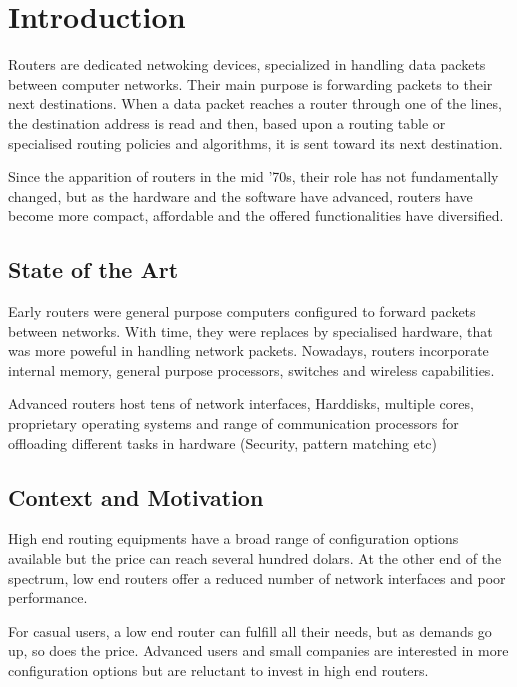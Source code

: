 \chapter{Introduction}
\label{chapter:intro}

Routers are dedicated netwoking devices, specialized in handling data
packets between computer networks. Their main purpose is forwarding packets to
their next destinations. When a data packet reaches a router through one of
the lines, the destination address is read and then, based upon a routing
table or specialised routing policies and algorithms, it is sent toward
its next destination.

Since the apparition of routers in the mid '70s, their role has not 
fundamentally changed, but as the hardware and the software have advanced, 
routers have become more compact, affordable and the offered functionalities
have diversified.


\section{State of the Art}
\label{sec:state-of-the-art}

Early routers were general purpose computers configured to forward packets
between networks. With time, they were replaces by specialised hardware,
that was more poweful in handling network packets.
Nowadays, routers incorporate internal memory, general purpose processors, 
switches and wireless capabilities.

Advanced routers host tens of network interfaces, Harddisks, multiple cores,
proprietary operating systems and range of communication processors
for offloading different tasks in hardware (Security, pattern matching etc)

\section{Context and Motivation}
\label{sec:context-and-motivation}

High end routing equipments have a broad range of configuration options
available but the price can reach several hundred dolars. At the other
end of the spectrum, low end routers offer a reduced number of network
interfaces and poor performance.

For casual users, a low end router can fulfill all their needs, but as
demands go up, so does the price. Advanced users and small companies
are interested in more configuration options but are reluctant to invest
in high end routers. 

